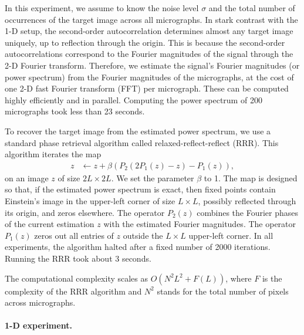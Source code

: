 \documentclass[12pt]{article}
\newcommand{\1}{\mathbf{1}}
\theoremstyle{plain}
\theoremstyle{definition}
\theoremstyle{remark}
\theoremstyle{plain}
\theoremstyle{remark}
\theoremstyle{plain}
\theoremstyle{plain}
\begin{document}
In this experiment, we assume to know the noise level $\sigma$ and the total number of occurrences of the target image across all micrographs.
In stark contrast with the 1-D setup, the second-order autocorrelation determines almost any target image uniquely, up to reflection through the origin. This is because the second-order autocorrelations correspond to the Fourier magnitudes of the signal through the 2-D Fourier transform. 
Therefore, we estimate the signal's Fourier magnitudes (or power spectrum) from the Fourier magnitudes of the micrographs, at the cost of one 2-D fast Fourier transform (FFT) per micrograph. These can be computed highly efficiently and in parallel.
Computing the power spectrum of 200 micrographs took less than 23 seconds. 

To recover the target image from the estimated power spectrum, we use a standard phase retrieval algorithm called relaxed-reflect-reflect (RRR). This algorithm iterates the map
\begin{align*}
z & \leftarrow z + \beta (P_2(2P_1(z) - z) - P_1(z)),
\end{align*}
on an image $z$ of size $2L\times 2L$.
We set the parameter $\beta$ to 1.
The map is designed so that, if the estimated power spectrum is exact, then fixed points contain Einstein's image in the upper-left corner of size $L \times L$, possibly reflected through its origin, and zeros elsewhere. The operator $P_2(z)$ combines the Fourier phases of  the current estimation $z$ with the estimated Fourier magnitudes. The operator $P_1(z)$ zeros out all entries of $z$ outside the $L\times L$ upper-left corner. In all experiments, the algorithm halted after a fixed number of 2000 iterations. Running the RRR took about 3 seconds. 

The computational complexity scales as $O(N^2L^2 + F(L))$, where $F$ is the complexity of the RRR algorithm and $N^2$ stands for the total number of pixels across micrographs. 

\paragraph{1-D experiment.}

%
\end{document}

